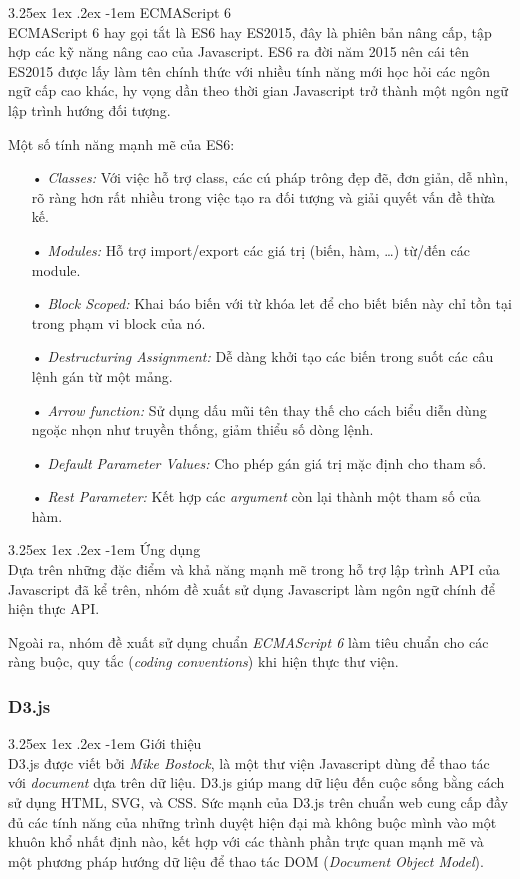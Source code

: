 \documentclass[12pt,a4paper,twoside]{article}
\makeatletter
\newcommand{\myparagraph}[1]{\paragraph{#1}\mbox{}\\} %
\renewcommand\paragraph{\@startsection{paragraph}{5}{\z@}%
  {3.25ex \@plus1ex \@minus.2ex}%
  {-1em}%
  {\normalfont\normalsize\bfseries}}
\makeatother
\begin{document}
\myparagraph{ECMAScript 6}
ECMAScript 6 hay gọi tắt là ES6 hay ES2015, đây là phiên bản nâng cấp, tập hợp các kỹ năng nâng cao của Javascript. ES6 ra đời năm 2015 nên cái tên ES2015 được lấy làm tên chính thức với nhiều tính năng mới học hỏi các ngôn ngữ cấp cao khác, hy vọng dần theo thời gian Javascript trở thành một ngôn ngữ lập trình hướng đối tượng.

Một số tính năng mạnh mẽ của ES6:
\begin{itemize}
\item[•] \emph{Classes:} Với việc hỗ trợ class, các cú pháp trông đẹp đẽ, đơn giản, dễ nhìn, rõ ràng hơn rất nhiều  trong việc tạo ra đối tượng và giải quyết vấn đề thừa kế.
\item[•] \emph{Modules:} Hỗ trợ import/export các giá trị (biến, hàm, …) từ/đến các module.
\item[•] \emph{Block Scoped:} Khai báo biến với từ khóa \textsf{let} để cho biết biến này chỉ tồn tại trong phạm vi block của nó.
\item[•] \emph{Destructuring Assignment:} Dễ dàng khởi tạo các biến trong suốt các câu lệnh gán từ một mảng.
\item[•] \emph{Arrow function:} Sử dụng dấu mũi tên thay thế cho cách biểu diễn dùng ngoặc nhọn như truyền thống, giảm thiểu số dòng lệnh.
\item[•] \emph{Default Parameter Values:} Cho phép gán giá trị mặc định cho tham số.
\item[•] \emph{Rest Parameter:} Kết hợp các \textit{argument} còn lại thành một tham số của hàm.
\end{itemize}

\myparagraph{Ứng dụng}
Dựa trên những đặc điểm và khả năng mạnh mẽ trong hỗ trợ lập trình API của Javascript đã kể trên, nhóm đề xuất sử dụng Javascript làm ngôn ngữ chính để hiện thực API.

Ngoài ra, nhóm đề xuất sử dụng chuẩn \textit{ECMAScript 6} làm tiêu chuẩn cho các ràng buộc, quy tắc (\textit{coding conventions}) khi hiện thực thư viện.
\subsubsection{D3.js}
\myparagraph{Giới thiệu}
D3.js được viết bởi \textit{Mike Bostock}, là một thư viện Javascript dùng để thao tác với \textit{document} dựa trên dữ liệu. D3.js giúp mang dữ liệu đến cuộc sống bằng cách sử dụng HTML, SVG, và CSS. Sức mạnh của D3.js trên chuẩn web cung cấp đầy đủ các tính năng của những trình duyệt hiện đại mà không buộc mình vào một khuôn khổ nhất định nào, kết hợp với các thành phần trực quan mạnh mẽ và một phương pháp hướng dữ liệu để thao tác DOM (\textit{Document Object Model}).
\end{document}
